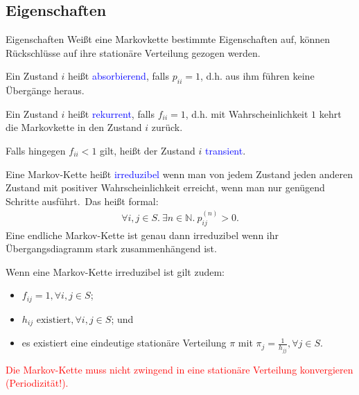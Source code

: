 \documentclass{beamer}
\def\padding{\vspace{0.5cm}}
\def\spadding{\vspace{0.25cm}}
\def\b{\textcolor{blue}}
\def\r{\textcolor{red}}
\begin{document}
\subsection{Eigenschaften}
\begin{frame}{Eigenschaften}
    Weißt eine Markovkette bestimmte Eigenschaften auf, können Rückschlüsse auf ihre stationäre Verteilung gezogen werden.\pause\par\padding
    \begin{definition}
        Ein Zustand $i$ heißt \b{absorbierend}, falls $p_{ii} = 1$, d.h. aus ihm führen keine Übergänge heraus.\pause\par\spadding
        Ein Zustand $i$ heißt \b{rekurrent}, falls $f_{ii} = 1$, d.h. mit Wahrscheinlichkeit $1$ kehrt die Markovkette in den Zustand $i$ zurück.\pause\par
        Falls hingegen $f_{ii} < 1$ gilt, heißt der Zustand $i$ \b{transient}.
    \end{definition}
\end{frame}

\begin{frame}
    \begin{definition}
        Eine Markov-Kette heißt \b{irreduzibel} wenn man von jedem Zustand jeden anderen Zustand mit positiver Wahrscheinlichkeit erreicht, wenn man nur genügend Schritte ausführt.\pause\ Das heißt formal:
        \begin{align*}
            \forall i, j \in S.\ \exists n \in \mathbb{N}.\ p_{ij}^{(n)} > 0.
        \end{align*}\pause
        Eine endliche Markov-Kette ist genau dann irreduzibel wenn ihr Übergangsdiagramm stark zusammenhängend ist.\pause\par\spadding
        Wenn eine Markov-Kette irreduzibel ist   gilt zudem:\pause
        \begin{itemize}
            \item $f_{ij} = 1, \forall i, j \in S$\pause;
            \item $h_{ij} \text{ existiert}, \forall i, j \in S$\pause; und
            \item es existiert eine eindeutige stationäre Verteilung $\pi$ mit $\pi_j = \frac{1}{h_{jj}}, \forall j \in S$.
        \end{itemize}\pause
        \r{Die Markov-Kette muss nicht zwingend in eine stationäre Verteilung konvergieren (Periodizität!).}
    \end{definition}
\end{frame}
\end{document}
